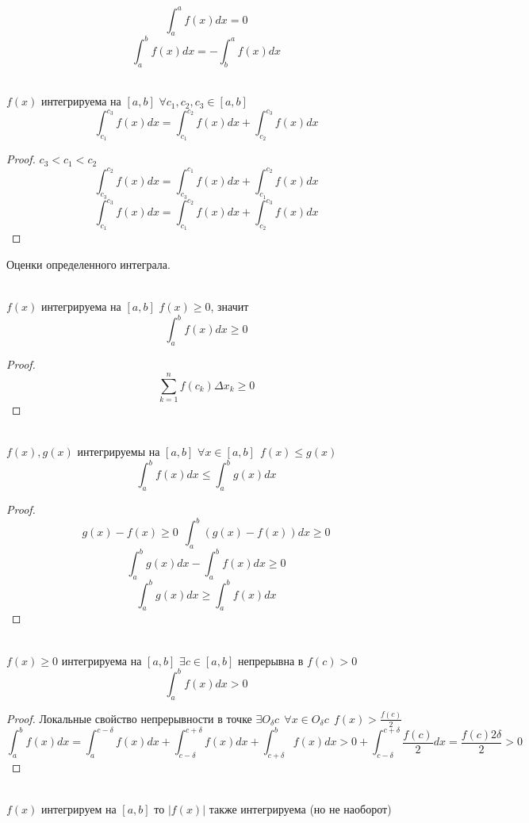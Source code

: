 \[
    \int_a^a f(x)dx = 0
\]
\[
    \int_a^b f(x)dx = - \int_b^a f(x)dx
\]

\\
$f(x)$ интегрируема на $[a, b]$ $\forall c_1, c_2, c_3 \in [a, b]$
    \[
    \int_{c_1}^{c_3} f(x)dx = \int_{c_1}^{c_2} f(x)dx + \int_{c_2}^{c_3} f(x)dx
    \]

\begin{proof}
  $c_3 < c_1 < c_2$
    \[
        \int_{c_3}^{c_2} f(x)dx = \int_{c_3}^{c_1}f(x)dx +
        \int_{c_1}^{c_2}f(x)dx
    \]
    \[
        \int_{c_1}^{c_3} f(x)dx = \int_{c_1}^{c_2}f(x)dx +
        \int_{c_2}^{c_3}f(x)dx
    \]
\end{proof}

\begin{title}[\Large]
    Оценки определенного интеграла.
\end{title}
\\
$f(x)$ интегрируема на $[a,b]$ $f(x) \ge 0$, значит
\[\int_a^b f(x)dx \ge 0\]
\begin{proof}
    \[\sum_{k=1}^{n} f(c_k)\Delta x_k \ge 0\]
\end{proof}
\\
    $f(x), g(x)$ интегрируемы на $[a, b]$ $\forall x \in [a, b] ~~ f(x)\le g(x)$
    \[\int_a^b f(x)dx \le \int_a^b g(x)dx\]
\begin{proof}
    \[g(x) - f(x) \ge 0 ~~ \int_a^b (g(x) - f(x))dx \ge 0\]
    \[\int_a^b g(x)dx - \int_a^b f(x)dx \ge 0\]
    \[\int_a^b g(x)dx \ge \int_a^b f(x)dx \]
\end{proof}

\\
$f(x) \ge 0$ интегрируема на $[a, b]$ $\exists c \in [a, b]$ непрерывна
в $f(c) > 0$ \[\int_a^b f(x)dx > 0\]
\begin{proof}
    Локальные свойство непрерывности в точке $\exists O_{\delta}c ~~
    \forall x \in O_{\delta}c ~~ f(x) > \frac{f(c)}{2}$
    \[
        \int_a^b f(x)dx = \int_a^{c-\delta} f(x)dx +
        \int_{c-\delta}^{c+\delta} f(x)dx + \int_{c+\delta}^b f(x)dx >
        0 + \int_{c-\delta}^{c+\delta} \frac{f(c)}{2}dx
        = \frac{f(c) 2\delta}{2} > 0
    \]
\end{proof}
\\
$f(x)$ интегрируем на $[a, b]$ то $|f(x)|$ также интегрируема
(но не наоборот)

